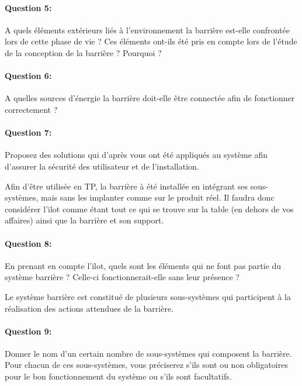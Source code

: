 \paragraph{Question 5:} A quels éléments extérieurs liés à l'environnement la barrière est-elle confrontée lors de cette phase de vie ? Ces éléments ont-ils été pris en compte lors de l'étude de la conception de la barrière ? Pourquoi ?

\paragraph{Question 6:} A quelles sources d'énergie la barrière doit-elle être connectée afin de fonctionner correctement ?

\paragraph{Question 7:} Proposez des solutions qui d'après vous ont été appliqués au système afin d'assurer la sécurité des utilisateur et de l'installation.

Afin d'être utilisée en TP, la barrière à été installée en intégrant ses sous-systèmes, mais sans les implanter comme sur le produit réel. Il faudra donc considérer l'ilot comme étant tout ce qui se trouve sur la table (en dehors de vos affaires) ainsi que la barrière et son support.

\paragraph{Question 8:} En prenant en compte l'ilot, quels sont les éléments qui ne font pas partie du système barrière ? Celle-ci fonctionnerait-elle sans leur présence ?


Le système barrière est constitué de plusieurs sous-systèmes qui participent à la réalisation des actions attendues de la barrière.

\paragraph{Question 9:} Donner le nom d'un certain nombre de sous-systèmes qui composent la barrière. Pour chacun de ces sous-systèmes, vous préciserez s'ils sont ou non obligatoires pour le bon fonctionnement du système ou s'ils sont facultatifs.

